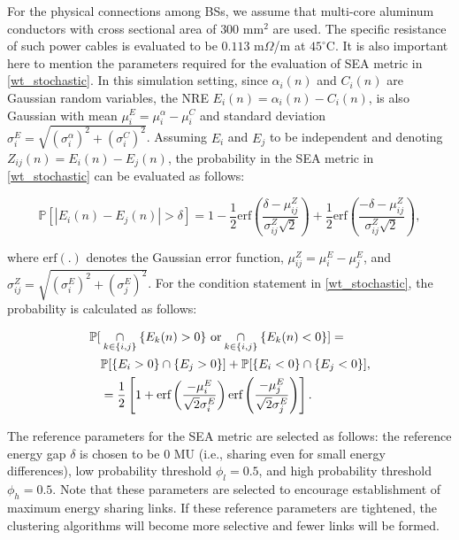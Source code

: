\documentclass[10pt, letter,twocolumn]{IEEEtran}
\begin{document}
For the physical connections among BSs, we assume that multi-core aluminum conductors with cross sectional area of $300$ mm$^{2}$ are used. The specific resistance of such power cables is evaluated to be $0.113$ m$\Omega$/m at $45^{\circ}$C\cite{cable_parameters}.
It is also important here to mention the parameters required for the evaluation of SEA metric in \eqref{wt_stochastic}. In this simulation setting, since $\alpha_{i}(n)$ and $C_{i}(n)$ are Gaussian random variables, the NRE $E_{i}(n) = \alpha_{i}(n) - C_{i}(n)$, is also Gaussian with mean $\mu_{i}^{E} = \mu_{i}^{\alpha} - \mu_{i}^{C}$ and standard deviation $\sigma_{i}^{E} = \sqrt{(\sigma_{i}^{\alpha})^{2} + (\sigma_{i}^{C})^{2}}$. Assuming $E_{i}$ and $E_{j}$ to be independent and denoting $Z_{ij}(n) = E_{i}(n) - E_{j}(n)$, the probability in the SEA metric in \eqref{wt_stochastic} can be evaluated as follows:

\vspace{-0.0in}
\small
\begin{equation}\label{prob_stochastic}
  \mathbb{P}[|E_{i}(n) - E_{j}(n)| > \delta] = 1 - \frac{1}{2} \text{erf}\left(\frac{ \delta - \mu_{ij}^{Z}}{\sigma_{ij}^{Z} \sqrt{2}  }\right) + \frac{1}{2} \text{erf}\left(\frac{- \delta - \mu_{ij}^{Z}}{\sigma_{ij}^{Z} \sqrt{2}  }\right),
\end{equation}
\normalsize

\noindent where $\text{erf}(.)$ denotes the Gaussian error function, $\mu_{ij}^{Z} = \mu_{i}^{E} - \mu_{j}^{E}$, and $\sigma_{ij}^{Z} = \sqrt{(\sigma_{i}^{E})^{2} + (\sigma_{j}^{E})^{2}}$. For the condition statement in \eqref{wt_stochastic}, the probability is calculated as follows:

\vspace{-0.0in}
\small
\begin{align}\label{metric_condition}
    \mathbb{P} [ &\underset{k \in \{i,j\}}{\cap} \{E_{k}(n) > 0\} \ \text{or} \underset{k \in \{i,j\}}{\cap} \{E_{k}(n) < 0\}  ] \notag =\\& \mathbb{P}[\{E_{i} > 0\} \cap \{E_{j} > 0\}] + \mathbb{P}[\{E_{i} < 0\} \cap \{E_{j} < 0\}], \notag \\
    &= \frac{1}{2} \left[ 1 + \text{erf}\left(\frac{- \mu_{i}^{E}}{\sqrt{2}\sigma_{i}^{E}} \right) \text{erf}\left(\frac{- \mu_{j}^{E}}{\sqrt{2} \sigma_{j}^{E}}\right) \right].
\end{align}
\normalsize

The reference parameters for the SEA metric are selected as follows: the reference energy gap $\delta$ is chosen to be $0$ MU (i.e., sharing even for small energy differences), low probability threshold $\phi_{l} = 0.5$, and high probability threshold $\phi_{h} = 0.5$. Note that these parameters are selected to encourage establishment of maximum energy sharing links. If these reference parameters are tightened, the clustering algorithms will become more selective and fewer links will be formed.
\end{document}
